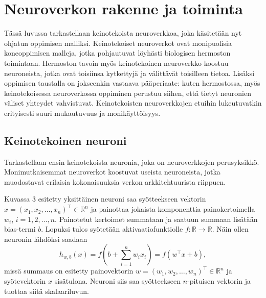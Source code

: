 \documentclass[12pt,a4paper,finnish,oneside,titlepage]{article}
\newcommand{\field}[1]{\mathbb{#1}}    %
\newcommand{\R}{\field{R}}             %
\theoremstyle{plain}
\theoremstyle{definition}
\theoremstyle{remark}
\begin{document}
\section{Neuroverkon rakenne ja toiminta}\label{sec:toinen}
Tässä luvussa tarkastellaan keinotekoista neuroverkkoa, joka käsitetään nyt ohjatun oppimisen malliksi. Keinotekoiset neuroverkot ovat monipuolisia koneoppimisen malleja, jotka pohjautuvat löyhästi biologisen hermoston toimintaan. Hermoston tavoin myös keinotekoinen neuroverkko koostuu neuroneista, jotka ovat toisiinsa kytkettyjä ja välittävät toisilleen tietoa. Lisäksi oppimisen taustalla on jokseenkin vastaava pääperiaate: kuten hermostossa, myös keinotekoisessa neuroverkossa oppiminen perustuu siihen, että tietyt neuronien väliset yhteydet vahvistuvat. Keinotekoisten neuroverkkojen etuihin lukeutuvatkin erityisesti suuri mukautuvuus ja monikäyttöisyys.

\subsection{Keinotekoinen neuroni}
Tarkastellaan ensin keinotekoista neuronia, joka on neuroverkkojen perusyksikkö. Monimutkaisemmat neuroverkot koostuvat useista neuroneista, jotka muodostavat erilaisia kokonaisuuksia verkon arkkitehtuurista riippuen.

Kuvassa 3 esitetty yksittäinen neuroni saa syötteekseen vektorin \(x=(x_1, x_2, \ldots, x_n)^{\top}\in \R^n\) ja painottaa jokaista komponenttia painokertoimella \(w_i\), \(i=1, 2, \ldots, n\). Painotetut kertoimet summataan ja saatuun summaan lisätään bias-termi \(b\). Lopuksi tulos syötetään aktivaatiofunktiolle \(f : \R\to \R\). Näin ollen neuronin lähdöksi saadaan \[h_{w,b}(x)=f\left(b+\sum_{i=1}^{n} w_i x_i\right)=f\left(w^{\top}x+b\right),\]
missä summaus on esitetty painovektorin \(w=(w_1, w_2, \ldots, w_n)^{\top}\in \R^n\) ja syötevektorin \(x\) sisätulona. Neuroni siis saa syötteekseen \(n\)-pituisen vektorin ja tuottaa siitä skalaariluvun.
\end{document}

